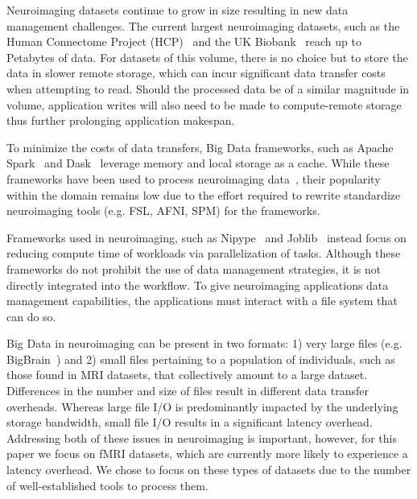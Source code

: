     Neuroimaging datasets continue to grow in size resulting in new data management challenges.
    The current largest neuroimaging datasets, such
    as the Human Connectome Project (HCP)~\cite{HCP} and the UK
    Biobank~\cite{ukbiobank} reach up to Petabytes of data. For datasets of this
    volume, there is no choice but to store the data in slower remote storage,
    which can incur significant data transfer costs when attempting to read.
    Should the processed data be of a similar magnitude in volume, application
    writes will also need to be made to compute-remote storage thus further
    prolonging application makespan. 

    To minimize the costs of data transfers, Big Data frameworks, such as Apache
    Spark~\cite{zaharia2016apache} and Dask~\cite{rocklin2015dask} leverage
    memory and local storage as a cache. While these frameworks have been used
    to process neuroimaging data~\cite{rokem2021pan,thunder,boubela2016big}, their popularity within the
    domain remains low due to the effort required to rewrite standardize
    neuroimaging tools (e.g. FSL, AFNI, SPM) for the frameworks. 
    
    Frameworks used in neuroimaging, such as Nipype~\cite{nipype} and
    Joblib~\cite{joblib} instead focus on reducing compute time of workloads via parallelization of tasks.
    Although these
    frameworks do not prohibit the use of data management strategies, it is not
    directly integrated into the workflow. To give neuroimaging
    applications data management capabilities, the applications must interact
    with a file system that can do so.

    Big Data in neuroimaging can be present in two formats: 1) very large files
    (e.g. BigBrain~\cite{amunts2013bigbrain}) and 2) small files pertaining to a
    population of individuals, such as those found in MRI datasets, that
    collectively amount to a large dataset. Differences in the number and size
    of files result in different data transfer overheads. Whereas large file I/O
    is predominantly impacted by the underlying storage bandwidth, small file
    I/O results in a significant latency overhead. Addressing both of these
    issues in neuroimaging is important, however, for this paper we focus on
    fMRI datasets, which are currently more likely to experience a latency
    overhead. We chose to focus on these types of datasets due to the number of
    well-established tools to process them.

